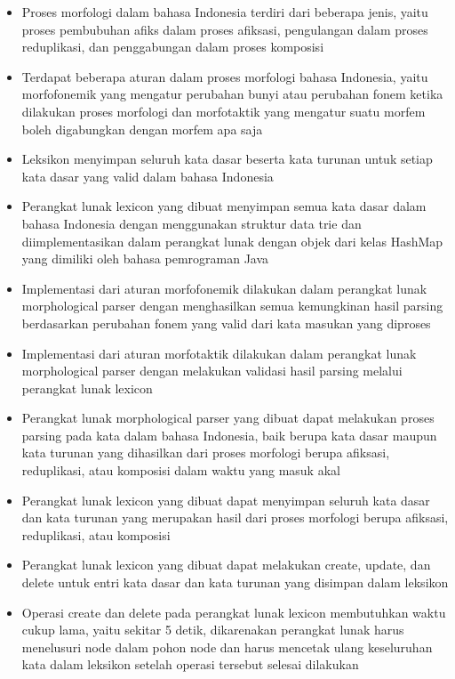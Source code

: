 \begin{itemize}
	\item Proses morfologi dalam bahasa Indonesia terdiri dari beberapa jenis, yaitu proses pembubuhan afiks dalam proses afiksasi, pengulangan dalam proses reduplikasi, dan penggabungan dalam proses komposisi
	\item Terdapat beberapa aturan dalam proses morfologi bahasa Indonesia, yaitu morfofonemik yang mengatur perubahan bunyi atau perubahan fonem ketika dilakukan proses morfologi dan morfotaktik yang mengatur suatu morfem boleh digabungkan dengan morfem apa saja
	\item Leksikon menyimpan seluruh kata dasar beserta kata turunan untuk setiap kata dasar yang valid dalam bahasa Indonesia
	\item Perangkat lunak lexicon yang dibuat menyimpan semua kata dasar dalam bahasa Indonesia dengan menggunakan struktur data trie dan diimplementasikan dalam perangkat lunak dengan objek dari kelas HashMap yang dimiliki oleh bahasa pemrograman Java
	\item Implementasi dari aturan morfofonemik dilakukan dalam perangkat lunak morphological parser dengan menghasilkan semua kemungkinan hasil parsing berdasarkan perubahan fonem yang valid dari kata masukan yang diproses 
	\item Implementasi dari aturan morfotaktik dilakukan dalam perangkat lunak morphological parser dengan melakukan validasi hasil parsing melalui perangkat lunak lexicon
	\item Perangkat lunak morphological parser yang dibuat dapat melakukan proses parsing pada kata dalam bahasa Indonesia, baik berupa kata dasar maupun kata turunan yang dihasilkan dari proses morfologi berupa afiksasi, reduplikasi, atau komposisi dalam waktu yang masuk akal
	\item Perangkat lunak lexicon yang dibuat dapat menyimpan seluruh kata dasar dan kata turunan yang merupakan hasil dari proses morfologi berupa afiksasi, reduplikasi, atau komposisi
	\item Perangkat lunak lexicon yang dibuat dapat melakukan create, update, dan delete untuk entri kata dasar dan kata turunan yang disimpan dalam leksikon
	\item Operasi create dan delete pada perangkat lunak lexicon membutuhkan waktu cukup lama, yaitu sekitar 5 detik, dikarenakan perangkat lunak harus menelusuri node dalam pohon node dan harus mencetak ulang keseluruhan kata dalam leksikon setelah operasi tersebut selesai dilakukan
\end{itemize}


